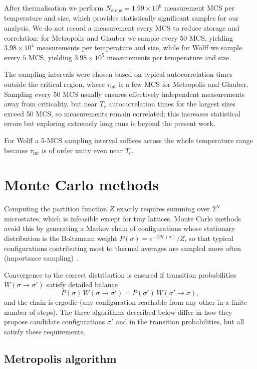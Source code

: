 After thermalisation we perform $N_{\text{steps}}=1.99\times10^6$ measurement MCS per temperature and size, which provides statistically significant samples for our analysis. We do not record a measurement every MCS to reduce storage and correlation: for Metropolis and Glauber we sample every $50$ MCS, yielding $3.98\times10^4$ measurements per temperature and size, while for Wolff we sample every $5$ MCS, yielding $3.98\times10^5$ measurements per temperature and size.

The sampling intervals were chosen based on typical autocorrelation times outside the critical region, where $\tau_{\mathrm{int}}$ is a few MCS for Metropolis and Glauber. Sampling every 50 MCS usually ensures effectively independent measurements away from criticality, but near $T_c$ autocorrelation times for the largest sizes exceed 50 MCS, so measurements remain correlated; this increases statistical errors but exploring extremely long runs is beyond the present work.

For Wolff a 5-MCS sampling interval suffices across the whole temperature range because $\tau_{\mathrm{int}}$ is of order unity even near $T_c$.

\section{Monte Carlo methods} \label{sec:montecarlo}

Computing the partition function $Z$ exactly requires summing over $2^N$ microstates, which is infeasible except for tiny lattices. Monte Carlo methods avoid this by generating a Markov chain of configurations whose stationary distribution is the Boltzmann weight $P(\sigma)=e^{-\beta\mathcal{H}(\sigma)}/Z$, so that typical configurations contributing most to thermal averages are sampled more often (importance sampling) \citep{Metropolis1953,Sokal1997}.

Convergence to the correct distribution is ensured if transition probabilities $W(\sigma\to\sigma')$ satisfy detailed balance
\[ P(\sigma)\,W(\sigma\to\sigma') = P(\sigma')\,W(\sigma'\to\sigma), \]
and the chain is ergodic (any configuration reachable from any other in a finite number of steps). The three algorithms described below differ in how they propose candidate configurations $\sigma'$ and in the transition probabilities, but all satisfy these requirements.

\subsection{Metropolis algorithm}

